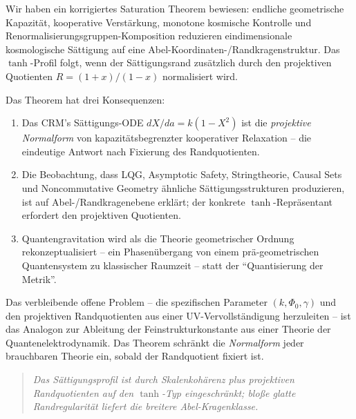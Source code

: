 \documentclass[aps,prd,twocolumn,superscriptaddress,nofootinbib]{revtex4-2}
\begin{document}
Wir haben ein korrigiertes Saturation Theorem bewiesen: endliche geometrische Kapazität, kooperative Verstärkung, monotone kosmische Kontrolle und Renormalisierungsgruppen-Komposition reduzieren eindimensionale kosmologische Sättigung auf eine Abel-Koordinaten-/Randkragenstruktur. Das $\tanh$-Profil folgt, wenn der Sättigungsrand zusätzlich durch den projektiven Quotienten $R=(1+x)/(1-x)$ normalisiert wird.

Das Theorem hat drei Konsequenzen:

\begin{enumerate}
\item Das CRM's Sättigungs-ODE $dX/da = k(1-X^2)$ ist die \textit{projektive Normalform} von kapazitätsbegrenzter kooperativer Relaxation -- die eindeutige Antwort nach Fixierung des Randquotienten.

\item Die Beobachtung, dass LQG, Asymptotic Safety, Stringtheorie, Causal Sets und Noncommutative Geometry ähnliche Sättigungsstrukturen produzieren, ist auf Abel-/Randkragenebene erklärt; der konkrete $\tanh$-Repräsentant erfordert den projektiven Quotienten.

\item Quantengravitation wird als die Theorie geometrischer Ordnung rekonzeptualisiert -- ein Phasenübergang von einem prä-geometrischen Quantensystem zu klassischer Raumzeit -- statt der ``Quantisierung der Metrik''.
\end{enumerate}

Das verbleibende offene Problem -- die spezifischen Parameter $(k, \Phi_0, \gamma)$ und den projektiven Randquotienten aus einer UV-Vervollständigung herzuleiten -- ist das Analogon zur Ableitung der Feinstrukturkonstante aus einer Theorie der Quantenelektrodynamik. Das Theorem schränkt die \textit{Normalform} jeder brauchbaren Theorie ein, sobald der Randquotient fixiert ist.

\begin{quote}
\textit{Das Sättigungsprofil ist durch Skalenkohärenz plus projektiven Randquotienten auf den $\tanh$-Typ eingeschränkt; bloße glatte Randregularität liefert die breitere Abel-Kragenklasse.}
\end{quote}
\end{document}
